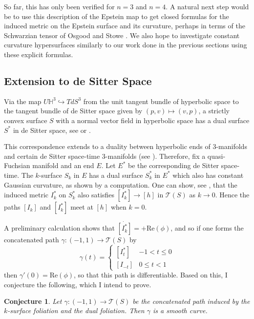 \documentclass[11pt]{amsart}
\renewcommand{\H}{\mathbb{H}}
\newtheorem*{conj*}{Conjecture}
\begin{document}
So far, this has only been verified for $n=3$ and $n=4$.
A natural next step would be to use this description of the Epstein map to get closed formulas for the induced metric on the Epstein surface and its curvature, perhaps in terms of the Schwarzian tensor of Osgood and Stowe \cite{osgood-stowe1992}.
We also hope to investigate constant curvature hypersurfaces similarly to our work done in the previous sections using these explicit formulas. 



\subsection{Extension to de Sitter Space}
Via the map $U\H^3 \hookrightarrow T dS^3$ from the unit tangent bundle of hyperbolic space to the tangent bundle of de Sitter space given by $(p,v) \mapsto (v,p)$, a strictly convex surface $S$ with a normal vector field in hyperbolic space has a dual surface $S^*$ in de Sitter space, see \cite{hodgson-rivin1993} or \cite{schlenker2002}. 

This correspondence extends to a duality between hyperbolic ends of 3-manifolds and certain de Sitter space-time 3-manifolds (see \cite{mess2007}).
Therefore, fix a quasi-Fuchsian manifold and an end $E$.
Let $E^*$ be the corresponding de Sitter space-time.
The $k$-surface $S_k$ in $E$ has a dual surface $S_k^*$ in $E^*$ which also has constant Gaussian curvature, as shown by a computation. 
One can show, see \cite{labourie1992}, that the induced metric $I_k^*$ on $S_k^*$ also satisfies $[I_k^*] \to [h]$ in $\mathcal{T}(S)$ as $k \to 0$. 
Hence the paths $[I_k]$ and $[I_k^*]$ meet at $[h]$ when $k = 0$. 

A preliminary calculation shows that $\dot{[I_k^*]} = +\mathrm{Re}(\phi)$, and so if one forms the concatenated path $\gamma : (-1,1) \to \mathcal{T}(S)$ by 
\[
\gamma(t) = 
\begin{cases}
[I_t^*]  & -1 < t \leq 0 \\
[I_{-t}] & 0 \leq t < 1
\end{cases}
\]
then $\gamma'(0) = \mathrm{Re}(\phi)$, so that this path is differentiable. 
Based on this, I conjecture the following, which I intend to prove.

\begin{conj*}
\label{deSitter path}
Let $\gamma: (-1,1) \to \mathcal{T}(S)$ be the concatenated path induced by the $k$-surface foliation and the dual foliation. 
Then $\gamma$ is a smooth curve. 
\end{conj*}
\end{document}
